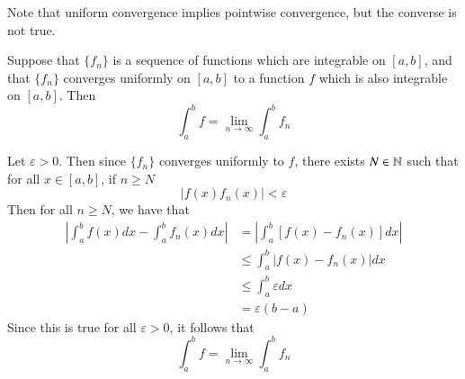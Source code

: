 \documentclass[12pt]{report}
\begin{document}
\begin{rmk}{}{}
    Note that uniform convergence implies pointwise convergence, but the converse is not true.
\end{rmk}

\begin{thm}{}{}
    Suppose that $\{f_n\}$ is a sequence of functions which are integrable on $[a,b]$, and that $\{f_n\}$ converges uniformly on $[a,b]$ to a function $f$ which is also integrable on $[a,b]$. Then \begin{equation*}
        \int_a^bf = \lim\limits_{n\rightarrow \infty}\int_a^bf_n
    \end{equation*}
\end{thm}
\begin{proof*}{}{}
    Let $\varepsilon > 0$. Then since $\{f_n\}$ converges uniformly to $f$, there exists $N \in \mathbb N$ such that for all $x \in [a,b]$, if $n \geq N$ \begin{equation*}
        |f(x) f_n(x)| < \varepsilon
    \end{equation*}
    Then for all $n \geq N$, we have that \begin{align*}
        \left|\int_a^bf(x)dx - \int_a^bf_n(x)dx\right| &= \left|\int_a^b[f(x) - f_n(x)]dx\right| \\
        &\leq \int_a^b |f(x) - f_n(x)| dx \\
        &\leq \int_a^b\varepsilon dx \\
        &= \varepsilon (b-a)
    \end{align*}
    Since this is true for all $\varepsilon > 0$, it follows that \begin{equation*}
        \int_a^bf = \lim\limits_{n\rightarrow \infty}\int_a^bf_n
    \end{equation*}
\end{proof*}
\end{document}
